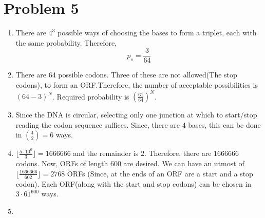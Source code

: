 \documentclass{article}
\begin{document}
\section{Problem 5}
\begin{enumerate}[label=(\alph*)]
    \item There are $4^3$ possible ways of choosing the bases to form a triplet, each with the same probability. Therefore, $$p_{s}=\frac{3}{64}$$
	\item There are 64 possible codons. Three of these are not allowed(The stop codons), to form an ORF.Therefore, the number of acceptable possibilities is $(64-3)^{N}$.\newline
	Required probability is $\left(\frac{61}{64}\right)^{N}$.
	\item Since the DNA is circular, selecting only one junction at which to start/stop reading the codon sequence suffices. \newline
	Since, there are $4$ bases, this can be done in $\binom{4}{2}= 6$ ways. 
	\item $\lfloor \frac{5\cdot 10^6}{3} \rfloor = 1666666$ and the remainder is $2$. Therefore, there are $1666666$ codons. Now, ORFs of length $600$ are desired. We can have an utmost of $ \lfloor \frac{1666666}{602} \rfloor = 2768$ ORFs (Since, at the ends of an ORF are a start and a stop codon). Each ORF(along with the start and stop codons) can be chosen in $3\cdot 61^{600}$ ways.\newline
	\item 
	\setlength{\voffset}{0cm}
\setlength{\hoffset}{0cm}



\setlength{\voffset}{-2.54cm}
\setlength{\hoffset}{-2.54cm}
\setlength{\voffset}{0cm}
\setlength{\hoffset}{0cm}



\setlength{\voffset}{-2.54cm}
\setlength{\hoffset}{-2.54cm}
\setlength{\voffset}{0cm}
\setlength{\hoffset}{0cm}



\setlength{\voffset}{-2.54cm}
\setlength{\hoffset}{-2.54cm}


\end{enumerate}
\end{document}
